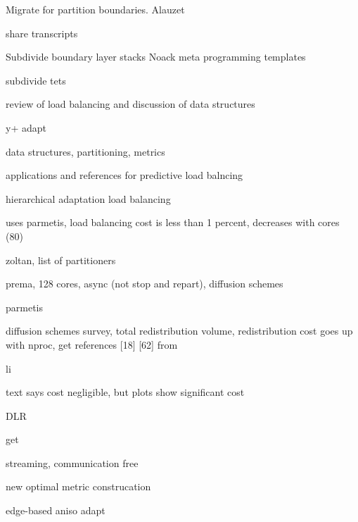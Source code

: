 \documentclass{article}
\begin{document}
Migrate for partition boundaries. 
Alauzet\cite{alauzet-li-seol-shephard-para-aniso}
\cite{kallinderis-load-balance}
\cite{lepage-parallel-adapt}
\cite{cavallo-para-adapt}
\cite{cavallo-phd-thesis}

share transcripts
\cite{park-darmofal-parallel-aniso-adapt-aiaa}
\cite{park-phd-thesis}

Subdivide boundary layer stacks
\cite{rpi-ec-2008-adapt-bl-visc}
\cite{kallinderis-adapt}
\cite{mavriplis-3d-adapt-mixed-subdivision}
\cite{lapage-habashi-3d-aniso-2002}
\cite{cavallo-phd-thesis}
\cite{kim-nakahashi-adjoint-adapt-viscous}
Noack meta programming templates\cite{noack-unstruct-mixed-adapt-template}

subdivide tets
\cite{rausch-unsteady-adaptation-3d}
\cite{waltz:2003}

review of load balancing and discussion of data structures
\cite{kallinderis-kavouklis-adapt-3d-hybrid,%
      kavouklis-kallinderis-parallel-3d-hybrid-adapt}

y+ adapt\cite{knopp-alrutz-schwambor-adapt-grid-wall-func-rans}

data structures, partitioning, metrics
\cite{flaherty-parallel-data-structures,teresco-phd-thesis-para-adapt-part-load-balancing}

applications and references for predictive load balncing
\cite{dindar-shephard-flaherty-adapt-rotorcraft-tc-rotor}

hierarchical adaptation\cite{kallinderis-parallel}
load balancing\cite{minyard-kallinderis-load-balance}

uses parmetis, load balancing cost is less than 1 percent, decreases with cores (80)
\cite{eccomas-2010-para-perf-adapt}

zoltan, list of partitioners
\cite{devine-anm-2005-zoltan-load-balancing}

prema, 128 cores, async (not stop and repart), diffusion schemes
\cite{chrisochoides-ieee-tpds-2004-load-balance}

parmetis
\cite{parmetis-sc-2000}

diffusion schemes survey, total redistribution volume, redistribution cost goes up with nproc,
get references [18] [62] from
\cite{oliker-thesis}

li
\cite{li-masters-thesis,li-load-balance}

text says cost negligible, but plots show significant cost
\cite{park-para-unsteady-adapt}

DLR\cite{tau-para-adapt-hybrid-eccomas}

get
\cite{selwood}

streaming, communication free\cite{pebay-parallel-adapt}


new optimal metric construcation
\cite{yano-darmofal-opt-framework-simplex-adapt}

edge-based aniso adapt
\cite{michal-krakos-aniso-adapt-edge}
\cite{loseille-lohner-imr18-3d-aniso-adapt-surf-vol-bl}



\end{document}
